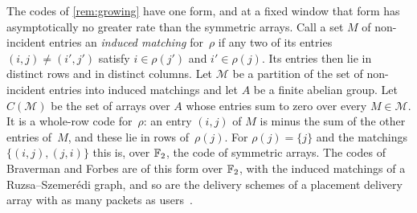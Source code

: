 The codes of \cref{rem:growing} have one form, and at a fixed window that form has asymptotically no greater rate
than the symmetric arrays. Call a set $M$ of non-incident entries an \emph{induced matching} for~$\rho$ if any two of its entries
$(i,j)\ne(i',j')$ satisfy $i\in\rho(j')$ and $i'\in\rho(j)$. Its entries then lie in distinct rows and in distinct
columns. Let $\mathcal M$ be a partition of the set of non-incident entries into induced matchings and let $A$ be a
finite abelian group. Let $C(\mathcal M)$ be the set of arrays over $A$ whose entries sum to zero over every
$M\in\mathcal M$. It is a whole-row code for~$\rho$: an entry $(i,j)$ of $M$ is minus the sum of the other entries
of~$M$, and these lie in rows of~$\rho(j)$. For $\rho(j)=\{j\}$ and the matchings $\{(i,j),(j,i)\}$ this is, over
$\mathbb{F}_2$, the code of symmetric arrays. The codes of Braverman and Forbes are of this form over $\mathbb{F}_2$, with the induced
matchings of a Ruzsa--Szemer\'edi graph, and so are the delivery schemes of a placement delivery array with as many
packets as users~\cite{YanEtAl2017}.

